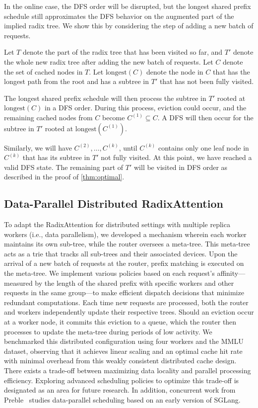 In the online case, the DFS order will be disrupted, but the longest shared prefix schedule still approximates the DFS behavior on the augmented part of the implied radix tree. We show this by considering the step of adding a new batch of requests.

Let \( T \) denote the part of the radix tree that has been visited so far, and \( T' \) denote the whole new radix tree after adding the new batch of requests. Let \( C \) denote the set of cached nodes in \( T \). Let \( \text{longest}(C) \) denote the node in \( C \) that has the longest path from the root and has a subtree in \( T' \) that has not been fully visited.

The longest shared prefix schedule will then process the subtree in $T'$ rooted at \( \text{longest}(C) \) in a DFS order. During this process, eviction could occur, and the remaining cached nodes from \( C \) become \( C^{(1)} \subseteq C \). A DFS will then occur for the subtree in $T'$ rooted at \( \text{longest}(C^{(1)}) \).

Similarly, we will have \( C^{(2)}, \ldots, C^{(k)} \), until \( C^{(k)} \) contains only one leaf node in \( C^{(k)} \) that has its subtree in $T'$ not fully visited. At this point, we have reached a valid DFS state. The remaining part of $T'$ will be visited in DFS order as described in the proof of \autoref{thm:optimal}.






\subsection{Data-Parallel Distributed RadixAttention}
\label{subsec:distributed_radix_attention}
To adapt the RadixAttention for distributed settings with multiple replica workers (i.e., data parallelism), we developed a mechanism wherein each worker maintains its own sub-tree, while the router oversees a meta-tree. 
This meta-tree acts as a trie that tracks all sub-trees and their associated devices. Upon the arrival of a new batch of requests at the router, prefix matching is executed on the meta-tree. We implement various policies based on each request's affinity—measured by the length of the shared prefix with specific workers and other requests in the same group—to make efficient dispatch decisions that minimize redundant computations.
Each time new requests are processed, both the router and workers independently update their respective trees. Should an eviction occur at a worker node, it commits this eviction to a queue, which the router then processes to update the meta-tree during periods of low activity.
We benchmarked this distributed configuration using four workers and the MMLU dataset, observing that it achieves linear scaling and an optimal cache hit rate with minimal overhead from this weakly consistent distributed cache design.
There exists a trade-off between maximizing data locality and parallel processing efficiency. Exploring advanced scheduling policies to optimize this trade-off is designated as an area for future research.
In addition, concurrent work from Preble~\cite{srivatsa2024preble} studies data-parallel scheduling based on an early version of SGLang.


